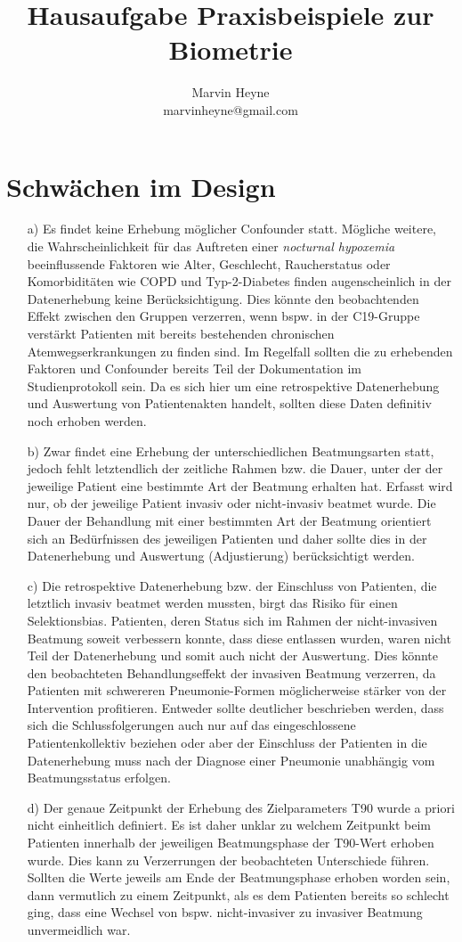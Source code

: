 \documentclass[toc=sectionentrywithdots]{scrartcl}
\title{Hausaufgabe Praxisbeispiele zur Biometrie}
\author{Marvin Heyne\\
  	\small marvinheyne@gmail.com \\
}
\theoremstyle{definition}
\theoremstyle{remark}
\begin{document}
\maketitle
\tableofcontents
\noindent

\section{Schwächen im Design}
\begin{enumerate}
	\item[a) ]Es findet keine Erhebung möglicher Confounder statt. Mögliche weitere, die Wahrscheinlichkeit für das Auftreten einer \textit{nocturnal hypoxemia} beeinflussende Faktoren wie Alter, Geschlecht, Raucherstatus oder Komorbiditäten wie COPD und Typ-2-Diabetes finden augenscheinlich in der Datenerhebung keine Berücksichtigung. Dies könnte den beobachtenden Effekt zwischen den Gruppen verzerren, wenn bspw. in der C19-Gruppe verstärkt Patienten mit bereits bestehenden chronischen Atemwegserkrankungen zu finden sind. Im Regelfall sollten die zu erhebenden Faktoren und Confounder bereits Teil der Dokumentation im Studienprotokoll sein. Da es sich hier um eine retrospektive Datenerhebung und Auswertung von Patientenakten handelt, sollten diese Daten definitiv noch erhoben werden. 
	\item[b) ]Zwar findet eine Erhebung der unterschiedlichen Beatmungsarten statt, jedoch fehlt letztendlich der zeitliche Rahmen bzw. die Dauer, unter der der jeweilige Patient eine bestimmte Art der Beatmung erhalten hat. Erfasst wird nur, ob der jeweilige Patient invasiv oder nicht-invasiv beatmet wurde. Die Dauer der Behandlung mit einer bestimmten Art der Beatmung orientiert sich an Bedürfnissen des jeweiligen Patienten und daher sollte dies in der Datenerhebung und Auswertung (Adjustierung) berücksichtigt werden.    
	\item[c) ]Die retrospektive Datenerhebung bzw. der Einschluss von Patienten, die letztlich invasiv beatmet werden mussten, birgt das Risiko für einen Selektionsbias. Patienten, deren Status sich im Rahmen der nicht-invasiven Beatmung soweit verbessern konnte, dass diese entlassen wurden, waren nicht Teil der Datenerhebung und somit auch nicht der Auswertung. Dies könnte den beobachteten Behandlungseffekt der invasiven Beatmung verzerren, da Patienten mit schwereren Pneumonie-Formen möglicherweise stärker von der Intervention profitieren. Entweder sollte deutlicher beschrieben werden, dass sich die Schlussfolgerungen auch nur auf das eingeschlossene Patientenkollektiv beziehen oder aber der Einschluss der Patienten in die Datenerhebung muss nach der Diagnose einer Pneumonie unabhängig vom Beatmungsstatus erfolgen. 
	\item[d) ]Der genaue Zeitpunkt der Erhebung des Zielparameters T90 wurde a priori nicht einheitlich definiert. Es ist daher unklar zu welchem Zeitpunkt beim Patienten innerhalb der jeweiligen Beatmungsphase der T90-Wert erhoben wurde. Dies kann zu Verzerrungen der beobachteten Unterschiede führen. Sollten die Werte jeweils am Ende der Beatmungsphase erhoben worden sein, dann vermutlich zu einem Zeitpunkt, als es dem Patienten bereits so schlecht ging, dass eine Wechsel von bspw. nicht-invasiver zu invasiver Beatmung unvermeidlich war. 
\end{enumerate}
\end{document}

